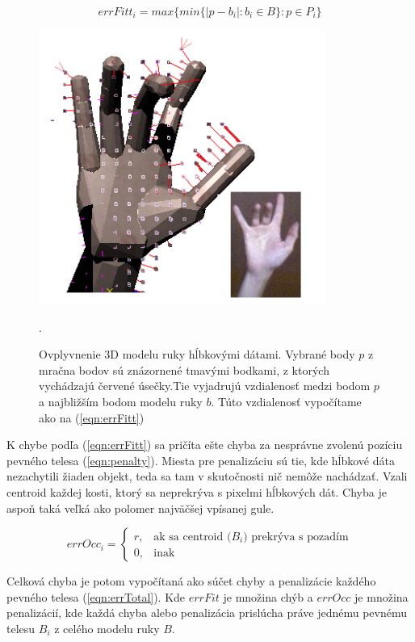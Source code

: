 \begin{equation}\label{eqn:errFitt}
    errFitt_i = max\{min\{|p-b_i|:b_i\in B\}:p\in P_i\}
\end{equation}

\begin{figure}[H]
	\begin{center}
		\includegraphics[height=\imageHeight]{images/42erroMesurement.png}
		\caption{Ovplyvnenie 3D modelu ruky hĺbkovými dátami. Vybrané body $p$ z mračna bodov sú znázornené tmavými bodkami, z ktorých vychádzajú červené úsečky.Tie vyjadrujú vzdialenosť medzi bodom $p$ a najbližším bodom modelu ruky $b$. Túto vzdialenosť vypočítame ako na (\ref{eqn:errFitt})}.
		\label{img:42erroMesurement}
	\end{center}
\end{figure}

K chybe podľa (\ref{eqn:errFitt}) sa pričíta ešte chyba za nesprávne zvolenú pozíciu pevného telesa (\ref{eqn:penalty}). Miesta pre penalizáciu sú tie, kde hĺbkové dáta nezachytili žiaden objekt, teda sa tam v skutočnosti nič nemôže nachádzať. Vzali centroid každej kosti, ktorý sa neprekrýva s pixelmi hĺbkových dát. Chyba je aspoň taká veľká ako polomer najväčšej vpísanej gule.

\begin{equation}\label{eqn:penalty}
    errOcc_i = 
    \begin{cases}
        r, & \text{ak sa centroid ($B_i$) prekrýva s pozadím}\\
        0, & \text{inak}
    \end{cases}
\end{equation}

Celková chyba je potom vypočítaná ako súčet chyby a penalizácie každého pevného telesa (\ref{eqn:errTotal}). Kde $errFit$ je množina chýb a $errOcc$ je množina penalizácií, kde každá chyba alebo penalizácia prislúcha práve jednému pevnému telesu $B_i$ z celého modelu ruky $B$.


